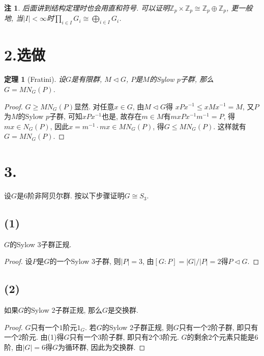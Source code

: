 \documentclass[12pt, a4paper, fontset=windows]{ctexart}
\newcommand{\Z}{\mathbb{Z}}
\newcommand{\abs}[1]{\left|{#1}\right|}
\newcommand{\isom}{\cong} %
\newcommand{\xuan}{{\normalsize 选做}}
\newtheorem*{remark}{注}
\newtheorem*{theorem}{定理}
\begin{document}
\begin{remark}
后面讲到结构定理时也会用直和符号. 可以证明$\Z_p\times\Z_p\isom\Z_p\oplus\Z_p$, 
更一般地, 当$\abs{I}<\infty$时$\prod_{i\in I}G_i\isom\bigoplus_{i\in I}G_i$. 
\end{remark}

\section*{2.\xuan}

\begin{theorem}[Fratini]
设$G$是有限群, $M\lhd G$, $P$是$M$的Sylow $p$子群, 那么$G=MN_G(P)$. 
\end{theorem}

\begin{proof}
$G\ge MN_G(P)$显然. 对任意$x\in G$, 由$M\lhd G$得
$xPx^{-1}\le xMx^{-1}=M$, 又$P$为$M$的Sylow $p$子群, 
可知$xPx^{-1}$也是, 故存在$m\in M$有$mxPx^{-1}m^{-1}=P$, 
得$mx\in N_G(P)$, 因此$x=m^{-1}\cdot mx\in MN_G(P)$, 
得$G\le MN_G(P)$. 这样就有$G=MN_G(P)$. 
\end{proof}

\section*{3.}

设$G$是$6$阶非阿贝尔群. 按以下步骤证明$G\isom S_3$. 

\subsection*{(1)}

$G$的Sylow $3$子群正规. 

\begin{proof}
设$P$是$G$的一个Sylow $3$子群, 则$\abs{P}=3$, 
由$[G:P]=\abs{G}/\abs{P}=2$得$P\lhd G$. 
\end{proof}

\subsection*{(2)}

如果$G$的Sylow $2$子群正规, 那么$G$是交换群. 

\begin{proof}
$G$只有一个$1$阶元$1_G$. 
若$G$的Sylow $2$子群正规, 则$G$只有一个$2$阶子群, 
即只有一个$2$阶元. 由(1)得$G$只有一个$3$阶子群, 
即只有$2$个$3$阶元. $G$的剩余$2$个元素只能是$6$阶, 
由$\abs{G}=6$得$G$为循环群, 因此为交换群. 
\end{proof}
\end{document}
